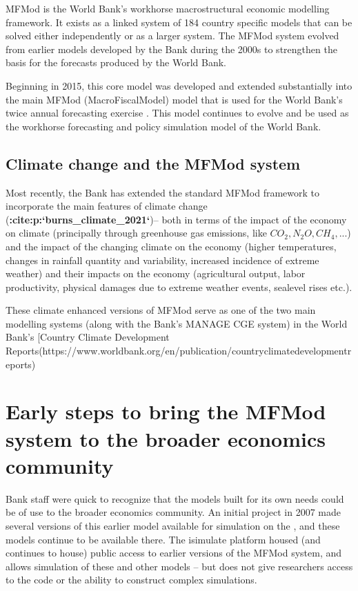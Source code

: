 \documentclass[letterpaper,10pt,english]{jupyterBook}
\begin{document}
\sphinxAtStartPar
MFMod is the World Bank’s work\sphinxhyphen{}horse macro\sphinxhyphen{}structural economic modelling framework. It exists as a linked system of 184 country specific models that can be solved either independently or as a larger system. The MFMod system evolved from earlier models developed by the Bank during the 2000s to strengthen the basis for the forecasts produced by the World Bank.

\sphinxAtStartPar
Beginning in 2015, this core model was developed and extended substantially into the main MFMod (MacroFiscalModel) model that is used for the World Bank’s twice annual forecasting exercise .  This model continues to evolve and be used as the workhorse forecasting and policy simulation model of the World Bank.


\subsection{Climate change and the MFMod system}
\label{\detokenize{content/01_Introduction/Introduction:climate-change-and-the-mfmod-system}}
\sphinxAtStartPar
Most recently, the Bank has extended the standard MFMod framework to incorporate the main features of climate change ({\color{red}\bfseries{}:cite:p:`burns\_climate\_2021`})– both in terms of the impact of the economy on climate (principally through green\sphinxhyphen{}house gas emissions, like \(CO_2, N_{2}O, CH_4, ...\)) and the impact of the changing climate on the economy (higher temperatures, changes in rainfall quantity and variability, increased incidence of extreme weather) and their impacts on the economy (agricultural output, labor productivity, physical damages due to extreme weather events, sea\sphinxhyphen{}level rises etc.).

\sphinxAtStartPar
These climate enhanced versions of MFMod serve as one of the two main modelling systems (along with the Bank’s MANAGE CGE system) in the World Bank’s {[}Country Climate Development Reports(https://www.worldbank.org/en/publication/country\sphinxhyphen{}climate\sphinxhyphen{}development\sphinxhyphen{}reports)


\section{Early steps to bring the MFMod system to the broader economics community}
\label{\detokenize{content/01_Introduction/Introduction:early-steps-to-bring-the-mfmod-system-to-the-broader-economics-community}}
\sphinxAtStartPar
Bank staff were quick to recognize that the models built for its own needs could be of use to the broader economics community. An initial project  in 2007 made several versions of this earlier model available for simulation on the , and these models continue to be available there.  The isimulate platform housed (and continues to house) public access to earlier versions of the MFMod system, and allows simulation of these and other models – but does not give researchers access to the code or the ability to construct complex simulations.
\end{document}
